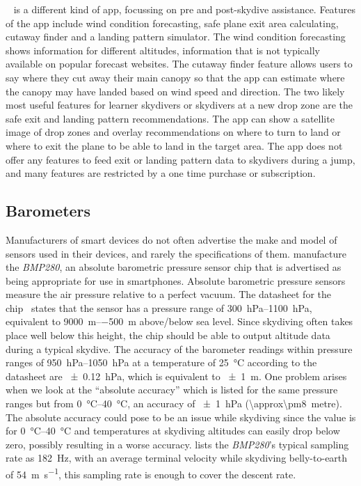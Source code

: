 \documentclass[11pt, a4paper, twocolumn]{article}
\newcommand{\hPa}{\hecto\pascal} %
\begin{document}
~\cite{inc_spot_2017} is a different kind of app, focussing on pre and post-skydive assistance. Features of the app include wind condition forecasting, safe plane exit area calculating, cutaway finder and a landing pattern simulator. The wind condition forecasting shows information for different altitudes, information that is not typically available on popular forecast websites. The cutaway finder feature allows users to say where they cut away their main canopy so that the app can estimate where the canopy may have landed based on wind speed and direction. The two likely most useful features for learner skydivers or skydivers at a new drop zone are the safe exit and landing pattern recommendations. The app can show a satellite image of drop zones and overlay recommendations on where to turn to land or where to exit the plane to be able to land in the target area. The app does not offer any features to feed exit or landing pattern data to skydivers during a jump, and many features are restricted by a one time purchase or subscription.

\subsection{Barometers}\label{sec:barometers} %

Manufacturers of smart devices do not often advertise the make and model of sensors used in their devices, and rarely the specifications of them. \citeauthor{bosch_bmp280:_2016} manufacture the \textit{BMP280}, an absolute barometric pressure sensor chip that is advertised as being appropriate for use in smartphones. Absolute barometric pressure sensors measure the air pressure relative to a perfect vacuum. The datasheet for the chip~\cite{bosch_bmp280:_2016} states that the sensor has a pressure range of \SIrange{300}{1100}{\hPa}, equivalent to \SIrange{+9000}{-500}{\metre} above/below sea level. Since skydiving often takes place well below this height, the chip should be able to output altitude data during a typical skydive. The accuracy of the barometer readings within pressure ranges of \SIrange{950}{1050}{\hPa} at a temperature of \SI{25}{\degreeCelsius} according to the datasheet are \SI{\pm0.12}{\hPa}, which is equivalent to \SI{\pm1}{\metre}. One problem arises when we look at the ``absolute accuracy'' which is listed for the same pressure ranges but from \SIrange{0}{40}{\degreeCelsius}, an accuracy of \SI{\pm1}{\hPa} (\SI{\approx\pm8}{metre}). The absolute accuracy could pose to be an issue while skydiving since the value is for \SIrange{0}{40}{\degreeCelsius} and temperatures at skydiving altitudes can easily drop below zero, possibly resulting in a worse accuracy. \citeauthor{bosch_bmp280:_2016} lists the \textit{BMP280}'s typical sampling rate as \SI{182}{\Hz}, with an average terminal velocity while skydiving belly-to-earth of \SI{54}{\metre\per\second}, this sampling rate is enough to cover the descent rate.
\end{document}
